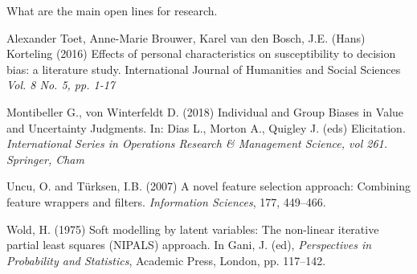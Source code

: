 \documentclass[a4paper,11pt]{article}
\begin{document}
What are the main open lines for research.




\begin{thebibliography}{}

Alexander Toet, Anne-Marie Brouwer, Karel van den Bosch, J.E. (Hans) Korteling (2016) Effects of personal characteristics on susceptibility to decision bias: a literature study. International Journal of Humanities and Social Sciences \textit{Vol. 8 No. 5, pp. 1-17}

Montibeller G., von Winterfeldt D. (2018) Individual and Group Biases in Value and Uncertainty Judgments. In: Dias L., Morton A., Quigley J. (eds) Elicitation. \textit{International Series in Operations Research \& Management Science, vol 261. Springer, Cham}

Uncu, O. and T\"urksen, I.B. (2007) A novel feature selection
approach: Combining feature wrappers and filters. \textit{Information Sciences}, 177, 449--466.

 Wold, H. (1975) Soft modelling by latent variables: The non-linear iterative partial least squares ({NIPALS})
approach. In Gani, J. (ed), \textit{Perspectives in Probability and Statistics}, Academic Press, London, pp. 117--142.


\end{thebibliography}
\end{document}
